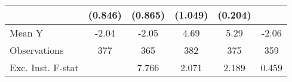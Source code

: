 {\begin{tabular}{l*{5}{c}}
            &     (0.846)         &     (0.865)         &     (1.049)         &     (0.204)         &                     \\
\midrule
Mean Y      &       -2.04         &       -2.05         &        4.69         &        5.29         &       -2.06         \\
Observations&         377         &         365         &         382         &         375         &         359         \\
Exc. Inst. F-stat&                     &       7.766         &       2.071         &       2.189         &       0.459         \\
\bottomrule
\end{tabular}
}
